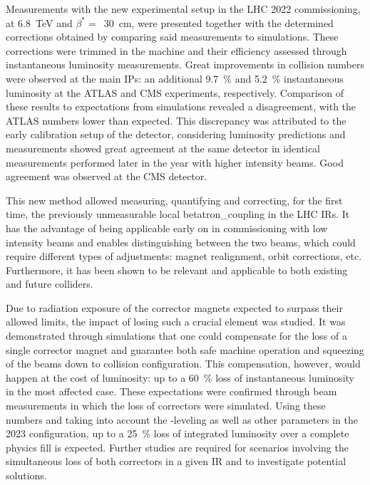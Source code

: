 Measurements with the new experimental setup in the \gls{LHC} \num{2022} commissioning, at \qty{6.8}{\tera\electronvolt} and \(\beta^{\ast} =\)~\qty{30}{\centi\meter}, were presented together with the determined corrections obtained by comparing said measurements to simulations.
These corrections were trimmed in the machine and their efficiency assessed through instantaneous \gls{luminosity} measurements.
Great improvements in collision numbers were observed at the main \glspl{IP}: an additional \qty{9.7}{\percent} and \qty{5.2}{\percent} instantaneous luminosity at the \acrshort{ATLAS} and \acrshort{CMS} \glspl{experiment}, respectively.
Comparison of these results to expectations from simulations revealed a disagreement, with the \acrshort{ATLAS} numbers lower than expected.
This discrepancy was attributed to the early calibration setup of the detector, considering luminosity predictions and measurements showed great agreement at the same detector in identical measurements performed later in the year with higher intensity beams.
Good agreement was observed at the \acrshort{CMS} detector.

This new method allowed measuring, quantifying and correcting, for the first time, the previously unmeasurable local \gls{betatron_coupling} in the \gls{LHC} \glspl{IR}.
It has the advantage of being applicable early on in commissioning with low intensity beams and enables distinguishing between the two beams, which could require different types of adjustments: magnet realignment, orbit corrections, etc.
Furthermore, it has been shown to be relevant and applicable to both existing and future colliders.

Due to radiation exposure of the corrector magnets expected to surpass their allowed limits, the impact of losing such a crucial element was studied.
It was demonstrated through simulations that one could compensate for the loss of a single corrector magnet and guarantee both safe machine operation and squeezing of the beams down to collision configuration.
This compensation, however, would happen at the cost of luminosity: up to a \qty{60}{\percent} loss of instantaneous luminosity in the most affected case.
These expectations were confirmed through beam measurements in which the loss of correctors were simulated.
Using these numbers and taking into account the -leveling as well as other parameters in the \num{2023} configuration, up to a \qty{25}{\percent} loss of integrated luminosity over a complete physics fill is expected.
Further studies are required for scenarios involving the simultaneous loss of both correctors in a given \gls{IR} and to investigate potential solutions.
\break

